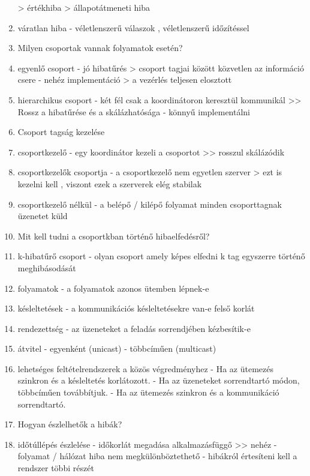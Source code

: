 \documentclass[twoside, a4paper, 12pt]{article}
\begin{document}
\begin{enumerate}
        > értékhiba
        > állapotátmeneti hiba
    \item váratlan hiba
        - véletlenszerű válaszok , véletlenszerű időzítéssel
    \item  Milyen csoportak vannak folyamatok esetén?
    \item egyenlő csoport
        - jó hibatűrés
        > csoport tagjai között közvetlen az információ csere
        - nehéz implementáció
        > a vezérlés teljesen elosztott
    \item hierarchikus csoport
        - két fél csak a koordinátoron keresztül kommunikál
        >> Rossz a hibatűrése és a skálázhatósága
        - könnyű implementálni
    \item  Csoport tagság kezelése
    \item csoportkezelő
        - egy koordinátor kezeli a csoportot
        >> rosszul skálázódik
    \item csoportkezelők csoportja
        - a csoportkezelő nem egyetlen szerver
        > ezt is kezelni kell , viszont ezek a szerverek elég stabilak
    \item csoportkezelő nélkül
        - a belépő / kilépő folyamat minden csoporttagnak üzenetet küld
    \item  Mit kell tudni a csoportkban történő hibaelfedésről?
    \item k-hibatűrő csoport
        - olyan csoport amely képes elfedni k tag egyszerre történő meghibásodását
    \item folyamatok
        - a folyamatok azonos ütemben lépnek-e
    \item késleltetések
        - a kommunikációs késleltetésekre van-e felső korlát
    \item rendezettség
        - az üzeneteket a feladás sorrendjében kézbesítik-e
    \item átvitel
        - egyenként (unicast)
        - többcíműen (multicast)
    \item lehetséges feltételrendszerek a közös végredményhez 
        - Ha az ütemezés szinkron és a késleltetés korlátozott.
        - Ha az üzeneteket sorrendtartó módon, többcíműen továbbítjuk.
        - Ha az ütemezés szinkron és a kommunikáció sorrendtartó.
    \item  Hogyan észlelhetők a hibák?
    \item időtúllépés észlelése
        - időkorlát megadása alkalmazásfüggő >> nehéz
        - folyamat / hálózat hiba nem megkülönböztethető
        - hibákról értesíteni kell a rendszer többi részét

\end{enumerate}
\end{document}
